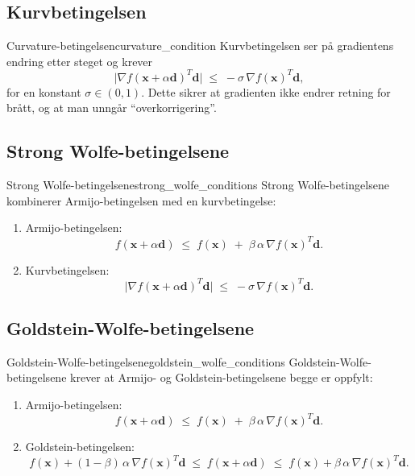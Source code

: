 \subsection{Kurvbetingelsen}
\begin{definition}{Curvature-betingelsen}{curvature_condition}
  Kurvbetingelsen ser på gradientens endring etter steget og krever
  \[
    \bigl|\nabla f(\symbf{x} + \alpha \symbf{d})^T \symbf{d}\bigr|
    \;\le\;
    -\sigma \,\nabla f(\symbf{x})^T \symbf{d},
  \]
  for en konstant \(\sigma \in (0,1)\). Dette sikrer at gradienten ikke endrer retning for brått, og at man unngår “overkorrigering”.
\end{definition}

\subsection{Strong Wolfe-betingelsene}
\begin{definition}{Strong Wolfe-betingelsene}{strong_wolfe_conditions}
  Strong Wolfe-betingelsene kombinerer Armijo-betingelsen med en kurvbetingelse:
  \begin{enumerate}
    \item Armijo-betingelsen:
          \[
            f(\symbf{x} + \alpha \symbf{d})
            \;\le\;
            f(\symbf{x})
            \;+\;
            \beta\,\alpha\,\nabla f(\symbf{x})^T \symbf{d}.
          \]
    \item Kurvbetingelsen:
          \[
            \bigl|\nabla f(\symbf{x} + \alpha \symbf{d})^T \symbf{d}\bigr|
            \;\le\;
            -\sigma \,\nabla f(\symbf{x})^T \symbf{d}.
          \]
  \end{enumerate}
\end{definition}

\subsection{Goldstein-Wolfe-betingelsene}
\begin{definition}{Goldstein-Wolfe-betingelsene}{goldstein_wolfe_conditions}
  Goldstein-Wolfe-betingelsene krever at Armijo- og Goldstein-betingelsene begge er oppfylt:
  \begin{enumerate}
    \item Armijo-betingelsen:
          \[
            f(\symbf{x} + \alpha \symbf{d})
            \;\le\;
            f(\symbf{x})
            \;+\;
            \beta\,\alpha\,\nabla f(\symbf{x})^T \symbf{d}.
          \]
    \item Goldstein-betingelsen:
          \[
            f(\symbf{x}) + (1-\beta)\,\alpha\,\nabla f(\symbf{x})^T \symbf{d}
            \;\le\;
            f(\symbf{x} + \alpha \symbf{d})
            \;\le\;
            f(\symbf{x}) + \beta\,\alpha\,\nabla f(\symbf{x})^T \symbf{d}.
          \]
  \end{enumerate}
\end{definition}

